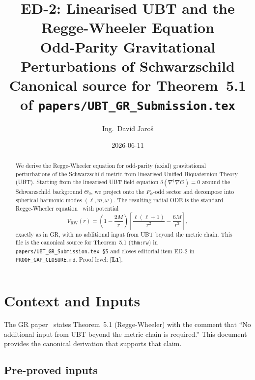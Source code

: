 \documentclass[12pt,a4paper]{article}
\title{\textbf{ED-2: Linearised UBT and the Regge-Wheeler Equation}\\[6pt]
  \large Odd-Parity Gravitational Perturbations of Schwarzschild\\[4pt]
  \normalsize Canonical source for Theorem~5.1 of \texttt{papers/UBT\_GR\_Submission.tex}}
\author{Ing.\ David Jaroš}
\date{2026-06-11}
\theoremstyle{definition}
\theoremstyle{remark}
\newcommand{\Lone}{\textbf{[L1]}}
\begin{document}
\maketitle

\begin{abstract}
We derive the Regge-Wheeler equation for odd-parity (axial) gravitational
perturbations of the Schwarzschild metric from linearised Unified Biquaternion
Theory (UBT).  Starting from the linearised UBT field equation
$\delta(\nabla^\dagger\nabla\Theta) = 0$ around the Schwarzschild background
$\Theta_0$, we project onto the $P_\psi$-odd sector and decompose into
spherical harmonic modes $(\ell, m, \omega)$.  The resulting radial ODE is
the standard Regge-Wheeler equation~\cite{regge_wheeler1957} with potential
\[
  V_{\mathrm{RW}}(r)
  = \left(1 - \frac{2M}{r}\right)
    \left[\frac{\ell(\ell+1)}{r^2} - \frac{6M}{r^3}\right],
\]
exactly as in GR, with no additional input from UBT beyond the metric chain.
This file is the canonical source for Theorem~5.1
(\texttt{thm:rw}) in \texttt{papers/UBT\_GR\_Submission.tex §5} and
closes editorial item ED-2 in \texttt{PROOF\_GAP\_CLOSURE.md}.
Proof level: \Lone.
\end{abstract}

\tableofcontents

\section{Context and Inputs}
\label{sec:context}

The GR paper~\cite{jaros2026_gr} states Theorem~5.1 (Regge-Wheeler) with the
comment that ``No additional input from UBT beyond the metric chain is
required.'' This document provides the canonical derivation that supports that
claim.

\subsection{Pre-proved inputs}
\end{document}
